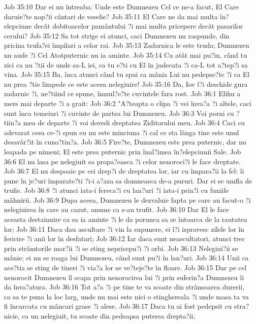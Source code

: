 Job 35:10  Dar ei nu întreaba: Unde este Dumnezeu Cel ce ne-a facut, El Care daruie?te nop?ii cântari de veselie?
Job 35:11  El Care ne da mai multa în?elepciune decât dobitoacelor pamântului ?i mai multa pricepere decât pasarilor cerului?
Job 35:12  Sa tot strige ei atunci, caci Dumnezeu nu raspunde, din pricina trufa?ei împilari a celor rai.
Job 35:13  Zadarnica le este truda; Dumnezeu nu aude ?i Cel Atotputernic nu ia aminte.
Job 35:14  Cu atât mai pu?in, când tu zici ca nu ?tii de unde sa-L iei, ca tu e?ti cu El în judecata ?i ca-L tot a?tep?i sa vina.
Job 35:15  Ba, înca atunci când tu spui ca mânia Lui nu pedepse?te ?i ca El nu prea ?tie limpede ce este aceea nelegiuire!
Job 35:16  Da, Iov î?i deschide gura zadarnic ?i, ne?tiind ce spune, înmul?e?te cuvintele fara rost.
Job 36:1  Elihu a mers mai departe ?i a grait:
Job 36:2  "A?teapta o clipa ?i vei înva?a ?i altele, caci sunt înca temeiuri ?i cuvinte de partea lui Dumnezeu.
Job 36:3  Voi porni cu ?tiin?a mea de departe ?i voi dovedi dreptatea Ziditorului meu.
Job 36:4  Caci cu adevarat ceea ce-?i spun eu nu este minciuna ?i cal ce sta lânga tine este unul desavâr?it în cuno?tin?a.
Job 36:5  Fire?te, Dumnezeu este prea puternic, dar nu leapada pe nimeni; El este prea puternic prin înal?imea în?elepciunii Sale.
Job 36:6  El nu lasa pe nelegiuit sa propa?easca ?i celor nenoroci?i le face dreptate.
Job 36:7  El nu despoaie pe cei drep?i de dreptatea lor, iar cu împara?ii la fel: îi pune în je?uri împarate?ti ?i-i a?aza sa domneasca de-a pururi. Dar ei se umfla de trufie.
Job 36:8  ?i atunci iata-i fereca?i cu lan?uri ?i iata-i prin?i cu funiile mâhnirii.
Job 36:9  Dupa aceea, Dumnezeu le dezvaluie fapta pe care au facut-o ?i nelegiuirea în care au cazut, anume ca s-au trufit.
Job 36:10  Dar El le face aceasta destainuire ca sa ia aminte ?i le da porunca sa se întoarca de la rautatea lor;
Job 36:11  Daca dau ascultare ?i vin la supunere, ei î?i ispravesc zilele lor în fericire ?i anii lor în desfatari;
Job 36:12  Iar daca sunt neascultatori, atunci trec prin strâmtorile mor?ii ?i se sting nepricepu?i ?i orbi.
Job 36:13  Nelegiui?ii se mânie; ei nu se roaga lui Dumnezeu, când sunt pu?i în lan?uri.
Job 36:14  Unii ca ace?tia se sting de tineri ?i via?a lor se ve?teje?te în floare.
Job 36:15  Dar pe cel nenorocit Dumnezeu îl scapa prin nenorocirea lui ?i prin suferin?a Dumnezeu îi da înva?atura.
Job 36:16  Tot a?a ?i pe tine te va scoate din strânsoarea durerii, ca sa te puna la loc larg, unde nu mai este nici o stinghereala ?i unde masa ta va fi încarcata cu mâncari grase ?i alese.
Job 36:17  Daca tu ai fost pedepsit cu stra?nicie, ca un nelegiuit, tu scoate din pedeapsa puterea drepta?ii;
